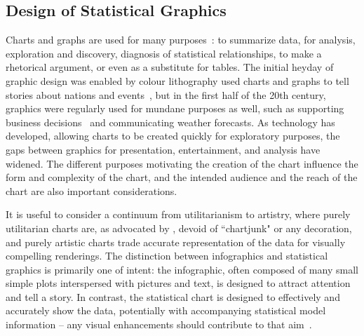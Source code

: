 \documentclass[letterpaper]{ar-1col}\usepackage[]{graphicx}\usepackage[]{color}
\begin{document}
\subsection{Design of Statistical Graphics}


Charts and graphs are used for many purposes~\citep{tukeyGraphicSemigraphicDisplays1972,fienbergGraphicalMethodsStatistics1979}: to summarize data, for analysis, exploration and discovery, diagnosis of statistical relationships, to make a rhetorical argument, or even as a substitute for tables. The initial heyday of graphic design was enabled by colour lithography used charts and graphs to tell stories about nations and events~\citep{kostelnickReEmergenceEmotionalAppeals2016}, but in the first half of the 20th century, graphics were regularly used for mundane purposes as well, such as supporting business decisions~\citep{chandarGraphStandardizationManagement2012,yatesGraphsManagerialTool1985a} and communicating weather forecasts. As technology has developed, allowing charts to be created quickly for exploratory purposes, the gaps between graphics for presentation, entertainment, and analysis have widened. The different purposes motivating the creation of the chart influence the form and complexity of the chart, and the intended audience and the reach of the chart are also important considerations.

It is useful to consider a continuum from utilitarianism to artistry, where purely utilitarian charts are, as advocated by \citet{tufte}, devoid of ``chartjunk" or any decoration, and purely artistic charts trade accurate representation of the data for visually compelling renderings. The distinction between infographics and statistical graphics is primarily one of intent: the infographic, often composed of many small simple plots interspersed with pictures and text, is designed to attract attention and tell a story. In contrast, the statistical chart is designed to effectively and accurately show the data, potentially with accompanying statistical model information -- any visual enhancements should contribute to that aim~\citep{gelmanInfovisStatisticalGraphics2013,wickham2013graphical}.
\end{document}
